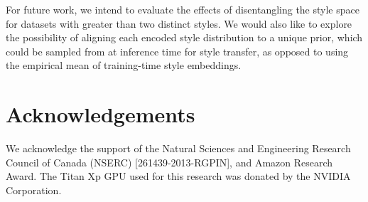 \documentclass[11pt,a4paper]{article}
\begin{document}
For future work, we intend to evaluate the effects of disentangling the style space for datasets with greater than two distinct styles. We would also like to explore the possibility of aligning each encoded style distribution to a unique prior, which could be sampled from at inference time for style transfer, as opposed to using the empirical mean of training-time style embeddings.

\section{Acknowledgements}
We acknowledge the support of the Natural Sciences and Engineering Research Council of Canada (NSERC) [261439-2013-RGPIN], and Amazon Research Award. The Titan Xp GPU used for this research was donated by the NVIDIA Corporation.




\end{document}
